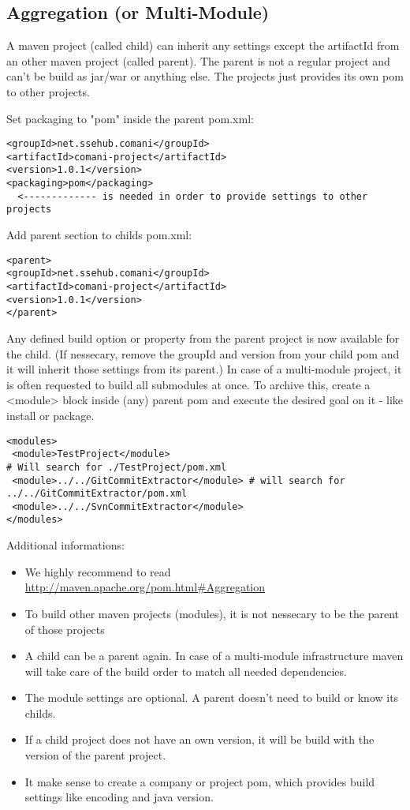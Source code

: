 \subsection{Aggregation (or Multi-Module)}
A maven project (called child) can inherit any settings except the artifactId from an other maven project (called parent). The parent is not a regular project and can't be build as jar/war or anything else. The projects just provides its own pom to other projects.   

Set packaging to "pom" inside the parent pom.xml:
\begin{lstlisting}
<groupId>net.ssehub.comani</groupId>
<artifactId>comani-project</artifactId>
<version>1.0.1</version>
<packaging>pom</packaging>
  <------------- is needed in order to provide settings to other projects
\end{lstlisting}

Add parent section to childs pom.xml:
\begin{lstlisting}
<parent>
<groupId>net.ssehub.comani</groupId>
<artifactId>comani-project</artifactId>
<version>1.0.1</version>
</parent>
\end{lstlisting}

Any defined build option or property from the parent project is now available for the child. (If nessecary, remove the groupId and version from your child pom and it will inherit those settings from its parent.)
In case of a multi-module project, it is often requested to build all submodules at once. To archive this, create a <module> block inside (any) parent pom and execute the desired goal on it - like install or package.  
\begin{lstlisting}
<modules>
 <module>TestProject</module>
# Will search for ./TestProject/pom.xml
 <module>../../GitCommitExtractor</module> # will search for ../../GitCommitExtractor/pom.xml
 <module>../../SvnCommitExtractor</module>
</modules>
\end{lstlisting}

Additional informations:
\begin{itemize}
	\item We highly recommend to read \url{http://maven.apache.org/pom.html#Aggregation}
	\item To build other maven projects (modules), it is not nessecary to be the parent of those projects
	\item A child can be a parent again. In case of a multi-module infrastructure maven will take care of the build order to match all needed dependencies. 
	\item The module settings are optional. A parent doesn't need to build or know its childs.
	\item If a child project does not have an own version, it will be build with the version of the parent project. 
	\item It make sense to create a company or project pom, which provides build settings like encoding and java version.
\end{itemize}

